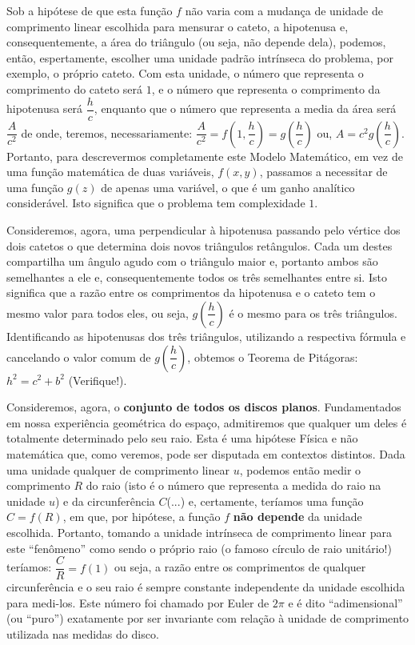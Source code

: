     Sob a hipótese de que esta função \(f\) não varia com a mudança de unidade de comprimento linear escolhida para mensurar o cateto, a hipotenusa e, consequentemente, a área do triângulo (ou seja, não depende dela), podemos, então, espertamente, escolher uma unidade padrão intrínseca do problema, por exemplo, o próprio cateto. Com esta unidade, o número que representa o comprimento do cateto será \(1\), e o número que representa o comprimento da hipotenusa será \(\dfrac{h}{c}\), enquanto que o número que representa a media da área será \(\dfrac{A}{c^2}\) de onde, teremos, necessariamente: \(\dfrac{A}{c^2} = f\left(1,\dfrac{h}{c}\right) = g\left(\dfrac{h}{c}\right)\) ou, \(A = c^2g\left(\dfrac{h}{c}\right)\). Portanto, para descrevermos completamente este Modelo Matemático, em vez de uma função matemática de duas variáveis, \(f(x, y)\), passamos a necessitar de uma função \(g(z)\) de apenas uma variável, o que é um ganho analítico considerável. Isto significa que o problema tem complexidade \(1\).

    Consideremos, agora, uma perpendicular à hipotenusa passando pelo vértice dos dois catetos o que determina dois novos triângulos retângulos. Cada um destes compartilha um ângulo agudo com o triângulo maior e, portanto ambos são semelhantes a ele e, consequentemente todos os três semelhantes entre si. Isto significa que a razão entre os comprimentos da hipotenusa e o cateto tem o mesmo valor para todos eles, ou seja, \(g\left(\dfrac{h}{c}\right)\) é o mesmo para os três triângulos. Identificando as hipotenusas dos três triângulos, utilizando a respectiva fórmula e cancelando o valor comum de \(g\left(\dfrac{h}{c}\right)\), obtemos o Teorema de Pitágoras: \(h^2 = c^2+b^2\) (Verifique!).

    Consideremos, agora, o \textbf{conjunto de todos os discos planos}. Fundamentados em nossa experiência geométrica do espaço, admitiremos que qualquer um deles é totalmente determinado pelo seu raio. Esta é uma hipótese Física e não matemática que, como veremos, pode ser disputada em contextos distintos. Dada uma unidade qualquer de comprimento linear \(u\), podemos então medir o comprimento \(R\) do raio (isto é o número que representa a medida do raio na unidade \(u\)) e da circunferência \(C\)(...) e, certamente, teríamos uma função \(C = f(R)\), em que, por hipótese, a função \(f\) \textbf{não depende} da unidade escolhida. Portanto, tomando a unidade intrínseca de comprimento linear para este ``fenômeno'' como sendo o próprio raio (o famoso círculo de raio unitário!) teríamos: \(\dfrac{C}{R} = f(1)\) ou seja, a razão entre os comprimentos de qualquer circunferência e o seu raio é sempre constante independente da unidade escolhida para medi-los. Este número foi chamado por Euler de \(2\pi\) e é dito ``adimensional'' (ou ``puro'') exatamente por ser invariante com relação à unidade de comprimento utilizada nas medidas do disco.

